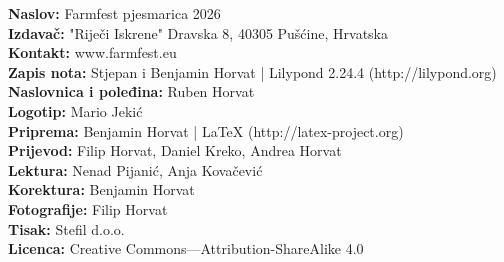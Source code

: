 \documentclass[a4paper,twoside, svgnames]{article}
\newcommand{\impresspac}{7pt}
\begin{document}
\begin{center}
\vspace*{\fill}
\begin{onehalfspacing}
\textbf{Naslov:} Farmfest pjesmarica 2026\\
\vspace{\impresspac}
\textbf{Izdavač:} "Riječi Iskrene" Dravska 8, 40305 Pušćine, Hrvatska\\
\vspace{\impresspac}
\textbf{Kontakt:} www.farmfest.eu\\
\vspace{\impresspac}
\textbf{Zapis nota:} Stjepan i Benjamin Horvat | Lilypond 2.24.4 (http://lilypond.org)\\
\vspace{\impresspac}
\textbf{Naslovnica i poleđina:} Ruben Horvat\\
\vspace{\impresspac}
\textbf{Logotip:} Mario Jekić\\
\vspace{\impresspac}
\textbf{Priprema:} Benjamin Horvat | LaTeX (http://latex-project.org)\\
\vspace{\impresspac}
\textbf{Prijevod:} Filip Horvat, Daniel Kreko, Andrea Horvat\\
\vspace{\impresspac}
\textbf{Lektura:} Nenad Pijanić, Anja Kovačević\\
\vspace{\impresspac}
\textbf{Korektura:} Benjamin Horvat\\
\vspace{\impresspac}
\textbf{Fotografije:} Filip Horvat\\
\vspace{\impresspac}
\textbf{Tisak:} Stefil d.o.o.\\
\vspace{\impresspac}
\textbf{Licenca:} Creative Commons—Attribution-ShareAlike 4.0\\
\vspace{\impresspac}
\vspace{\impresspac}
\vspace{\impresspac}
\vspace{\impresspac}

\end{onehalfspacing}
\end{center}
\end{document}
